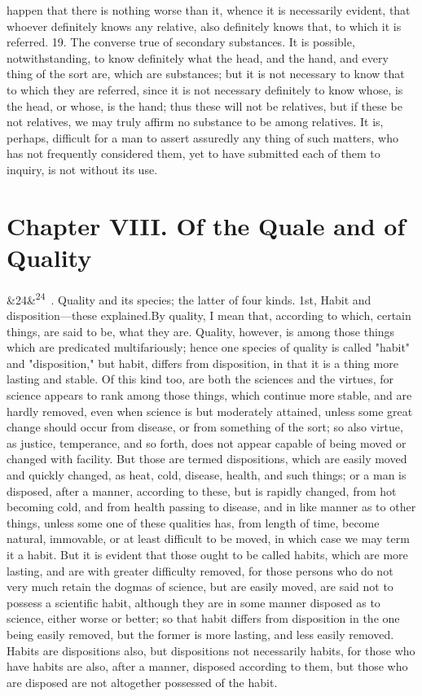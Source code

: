 \documentclass[12pt]{article}
\newcommand{\para}[1][]{\par\noindent\ifx&#1&\else\textsuperscript{\footnotesize #1}~\fi}
\begin{document}
happen that there is nothing worse than it, whence it is necessarily evident, that whoever definitely knows any relative, also definitely knows that, to which it is referred. 19. The converse true of secondary substances. It is possible, notwithstanding, to know definitely what the head, and the hand, and every thing of the sort are, which are substances; but it is not necessary to know that to which they are referred, since it is not necessary definitely to know whose, is the head, or whose, is the hand; thus these will not be relatives, but if these be not relatives, we may truly affirm no substance to be among relatives. It is, perhaps, difficult for a man to assert assuredly any thing of such matters, who has not frequently considered them, yet to have submitted each of them to inquiry, is not without its use.

\section*{Chapter VIII. Of the Quale and of Quality}

\para[24] 1. Quality and its species; the latter of four kinds. 1st, Habit and disposition---these explained.By quality, I mean that, according to which, certain things, are said to be, what they are. Quality, however, is among those things which are predicated multifariously; hence one species of quality is called "habit" and "disposition," but habit, differs from disposition, in that it is a thing more lasting and stable. Of this kind too, are both the sciences and the virtues, for science appears to rank among those things, which continue more stable, and are hardly removed, even when science is but moderately attained, unless some great change should occur from disease, or from something of the sort; so also virtue, as justice, temperance, and so forth, does not appear capable of being moved or changed with facility. But those are termed dispositions, which are easily moved and quickly changed, as heat, cold, disease, health, and such things; or a man is disposed, after a manner, according to these, but is rapidly changed, from hot becoming cold, and from health passing to disease, and in like manner as to other things, unless some one of these qualities has, from length of time, become natural, immovable, or at least difficult to be moved, in which case we may term it a habit. But it is evident that those ought to be called habits, which are more lasting, and are with greater difficulty removed, for those persons who do not very much retain the dogmas of science, but are easily moved, are said not to possess a scientific habit, although they are in some manner disposed as to science, either worse or better; so that habit differs from disposition in the one being easily removed, but the former is more lasting, and less easily removed. Habits are dispositions also, but dispositions not necessarily habits, for those who have habits are also, after a manner, disposed according to them, but those who are disposed are not altogether possessed of the habit.
\end{document}
